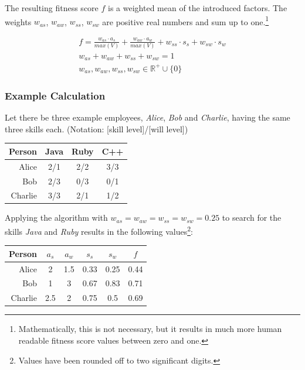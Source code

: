 The resulting fitness score $f$ is a weighted mean of the introduced factors. The weights $w_{as}$, $w_{aw}$, $w_{ss}$, $w_{sw}$ are positive real numbers and sum up to one.\footnote{Mathematically, this is not necessary, but it results in much more human readable fitness score values between zero and one.}

\begin{gather*}
  f = \frac{w_{as} \cdot a_s}{max(V)} + \frac{w_{aw} \cdot a_w}{ max(V)} + w_{ss} \cdot s_s + w_{sw} \cdot s_w \\
  w_{as} + w_{aw} + w_{ss} + w_{sw} = 1 \\
  w_{as}, w_{aw}, w_{ss}, w_{sw} \in \mathbb{R}^{+} \cup \{0\}
\end{gather*}

\newpage

\subsubsection{Example Calculation}
Let there be three example employees, \textit{Alice}, \textit{Bob} and \textit{Charlie}, having the same three skills each.
(Notation: [skill level]/[will level])
\label{example-fitness}
\newline
\newline
\begin{center}
\begin{tabular}{r|ccc}
  Person  & Java & Ruby & C++ \\
  \hline
  Alice   & 2/1  & 2/2 & 3/3 \\
  Bob     & 2/3  & 0/3 & 0/1 \\
  Charlie & 3/3  & 2/1 & 1/2 \\
\end{tabular}
\end{center}

Applying the algorithm with $w_{as} = w_{aw} = w_{ss} = w_{sw} = 0.25$ to search for the skills \textit{Java} and \textit{Ruby} results in the following values\footnote{Values have been rounded off to two significant digits.}:


\begin{center}
\begin{tabular}{r|cccc|c}
  Person  & $a_s$ & $a_w$ & $s_s$ & $s_w$ & $f$\\
  \hline
  Alice   & 2   & 1.5 & 0.33 & 0.25 & 0.44\\
  Bob     & 1   & 3   & 0.67 & 0.83 & 0.71\\
  Charlie & 2.5 & 2   & 0.75 & 0.5  & 0.69\\
\end{tabular}
\end{center}

